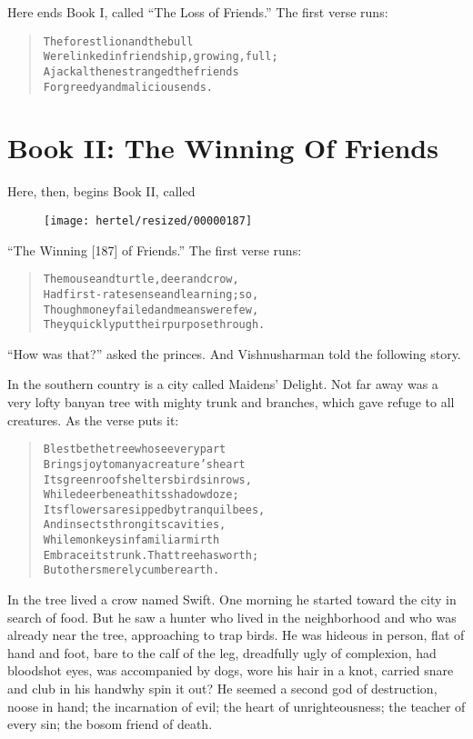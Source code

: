 \documentclass[article, twoside, 10pt]{memoir}
\renewenvironment{verbatim}{%
\begin{quote}%
\vskip -10pt%
\begin{alltt}\normalfont\small}{\end{alltt}%
\end{quote}%
\vskip -10pt
} %
\begin{document}
Here ends Book I, called ``The Loss of Friends.'' The first verse
runs:

\begin{verbatim}
The forest lion and the bull
Were linked in friendship, growing, full;
A jackal then estranged the friends
For greedy and malicious ends.
\end{verbatim}
\part{Book II: The Winning Of Friends}

Here, then, begins Book II, called
\begin{figure}[p]\texttt{[image: hertel/resized/00000187]}\end{figure}``The Winning [187] of Friends.'' The first verse runs:

\begin{verbatim}
The mouse and turtle, deer and crow,
Had first-rate sense and learning; so,
Though money failed and means were few,
They quickly put their purpose through.
\end{verbatim}
``How was that?'' asked the princes. And Vishnusharman told the
following story.

In the southern country is a city called Maidens' Delight. Not far
away was a very lofty banyan tree with mighty trunk and branches,
which gave refuge to all creatures. As the verse puts it:

\begin{verbatim}
Blest be the tree whose every part
Brings joy to many a creature's heart{\textemdash}
Its green roof shelters birds in rows,
While deer beneath its shadow doze;
Its flowers are sipped by tranquil bees,
And insects throng its cavities,
While monkeys in familiar mirth
Embrace its trunk. That tree has worth;
But others merely cumber earth.
\end{verbatim}
In the tree lived a crow named Swift. One morning he started toward
the city in search of food. But he saw a hunter who lived in the
neighborhood and who was already near the tree, approaching to trap
birds. He was hideous in person, flat of hand and foot, bare to the
calf of the leg, dreadfully ugly of complexion, had bloodshot eyes,
was accompanied by dogs, wore his hair in a knot, carried snare and
club in his hand{\textemdash}why spin it out? He seemed a second god of
destruction, noose in hand; the incarnation of evil; the heart of
unrighteousness; the teacher of every sin; the bosom friend of
death.
\end{document}
